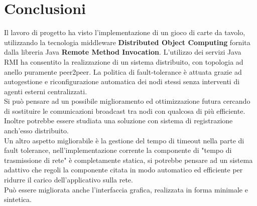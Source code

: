 \documentclass[10pt,a4paper]{article}
\begin{document}
\section{Conclusioni}
Il lavoro di progetto ha visto l'implementazione di un gioco di carte da tavolo, utilizzando la tecnologia middleware \textbf{Distributed Object Computing} fornita dalla libreria Java \textbf{Remote Method Invocation}. L'utilizzo dei servizi Java RMI ha consentito la realizzazione di un sistema distribuito, con topologia ad anello puramente peer2peer. La politica di fault-tolerance è attuata grazie ad autogestione e riconfigurazione automatica dei nodi stessi senza interventi di agenti esterni centralizzati. \\Si può pensare ad un possibile miglioramento ed ottimizzazione futura cercando di sostituire le comunicazioni broadcast tra nodi con qualcosa di più efficiente. Inoltre potrebbe essere studiata una soluzione con sistema di registrazione anch'esso distribuito.\\
Un altro aspetto migliorabile è la gestione del tempo di timeout nella parte di fault tolerance, nell'implementazione corrente la componente di "tempo di trasmissione di rete" è completamente statica, si potrebbe pensare ad un sistema adattivo che regoli la componente citata in modo automatico ed efficiente per ridurre il carico dell'applicativo sulla rete.
\\
Può essere migliorata anche l'interfaccia grafica, realizzata in forma minimale e sintetica.
\end{document}
